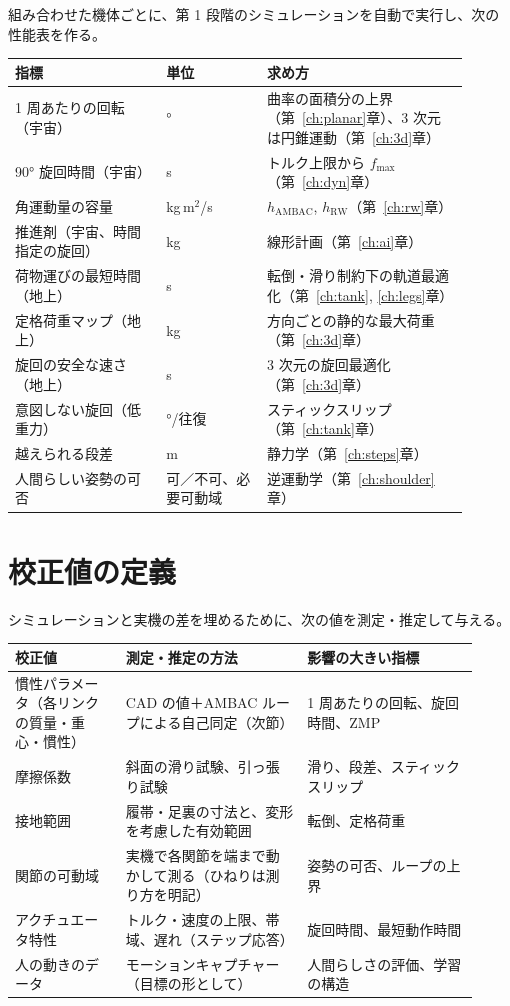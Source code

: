 組み合わせた機体ごとに、第 1 段階のシミュレーションを自動で実行し、次の性能表を作る。

\begin{longtable}{p{0.30\linewidth}p{0.20\linewidth}p{0.40\linewidth}}
\toprule
指標 & 単位 & 求め方 \\ \midrule \endhead
1 周あたりの回転（宇宙） & ° & 曲率の面積分の上界（第~\ref{ch:planar}章）、3 次元は円錐運動（第~\ref{ch:3d}章） \\
90° 旋回時間（宇宙） & s & トルク上限から $f_{\max}$（第~\ref{ch:dyn}章） \\
角運動量の容量 & kg\,m$^2$/s & $h_{\mathrm{AMBAC}}$, $h_{\mathrm{RW}}$（第~\ref{ch:rw}章） \\
推進剤（宇宙、時間指定の旋回） & kg & 線形計画（第~\ref{ch:ai}章） \\
荷物運びの最短時間（地上） & s & 転倒・滑り制約下の軌道最適化（第~\ref{ch:tank}, \ref{ch:legs}章） \\
定格荷重マップ（地上） & kg & 方向ごとの静的な最大荷重（第~\ref{ch:3d}章） \\
旋回の安全な速さ（地上） & s & 3 次元の旋回最適化（第~\ref{ch:3d}章） \\
意図しない旋回（低重力） & °/往復 & スティックスリップ（第~\ref{ch:tank}章） \\
越えられる段差 & m & 静力学（第~\ref{ch:steps}章） \\
人間らしい姿勢の可否 & 可／不可、必要可動域 & 逆運動学（第~\ref{ch:shoulder}章） \\
\bottomrule
\end{longtable}

\section{校正値の定義}

シミュレーションと実機の差を埋めるために、次の値を測定・推定して与える。

\begin{longtable}{p{0.22\linewidth}p{0.36\linewidth}p{0.34\linewidth}}
\toprule
校正値 & 測定・推定の方法 & 影響の大きい指標 \\ \midrule \endhead
慣性パラメータ（各リンクの質量・重心・慣性） & CAD の値＋AMBAC ループによる自己同定（次節） & 1 周あたりの回転、旋回時間、ZMP \\
摩擦係数 & 斜面の滑り試験、引っ張り試験 & 滑り、段差、スティックスリップ \\
接地範囲 & 履帯・足裏の寸法と、変形を考慮した有効範囲 & 転倒、定格荷重 \\
関節の可動域 & 実機で各関節を端まで動かして測る（ひねりは測り方を明記） & 姿勢の可否、ループの上界 \\
アクチュエータ特性 & トルク・速度の上限、帯域、遅れ（ステップ応答） & 旋回時間、最短動作時間 \\
人の動きのデータ & モーションキャプチャー（目標の形として） & 人間らしさの評価、学習の構造 \\
\bottomrule
\end{longtable}

